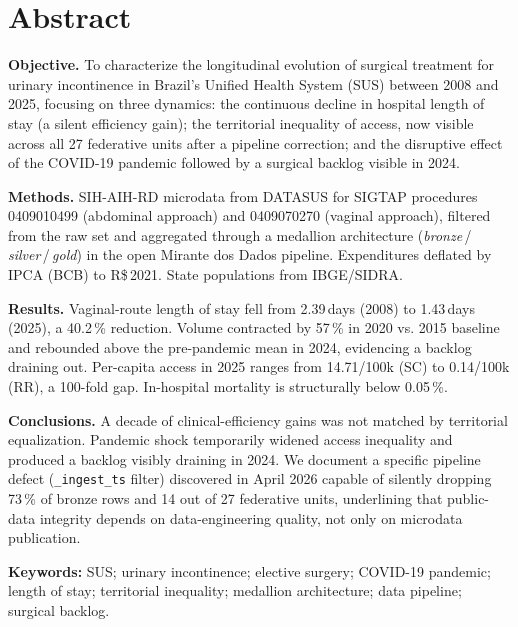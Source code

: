 \documentclass[12pt,a4paper,oneside]{article}
\newcommand{\rs}{R\$\,}
\begin{document}
\section*{Abstract}
\begin{singlespace}\small\noindent
\textbf{Objective.} To characterize the longitudinal evolution of
surgical treatment for urinary incontinence in Brazil's Unified
Health System (SUS) between 2008 and 2025, focusing on three
dynamics: the continuous decline in hospital length of stay (a
silent efficiency gain); the territorial inequality of access,
now visible across all 27 federative units after a pipeline
correction; and the disruptive effect of the COVID-19 pandemic
followed by a surgical backlog visible in 2024.

\textbf{Methods.} SIH-AIH-RD microdata from DATASUS for SIGTAP
procedures 0409010499 (abdominal approach) and 0409070270 (vaginal
approach), filtered from the raw set and aggregated through a
medallion architecture (\textit{bronze}\,/\,\textit{silver}\,/\,\textit{gold})
in the open Mirante dos Dados pipeline. Expenditures deflated by
IPCA (BCB) to \rs 2021. State populations from IBGE/SIDRA.

\textbf{Results.} Vaginal-route length of stay fell from
2.39\,days (2008) to 1.43\,days (2025), a 40.2\,\% reduction.
Volume contracted by 57\,\% in 2020 vs.
2015 baseline and rebounded above the pre-pandemic
mean in 2024, evidencing a backlog draining out.
Per-capita access in 2025 ranges from 14.71/100k (SC) to
0.14/100k (RR), a 100-fold gap. In-hospital mortality is
structurally below 0.05\,\%.

\textbf{Conclusions.} A decade of clinical-efficiency gains was
not matched by territorial equalization. Pandemic shock
temporarily widened access inequality and produced a backlog
visibly draining in 2024. We document a specific
pipeline defect (\texttt{\_ingest\_ts} filter) discovered in
April 2026 capable of silently dropping 73\,\% of bronze rows
and 14 out of 27 federative units, underlining that public-data
integrity depends on data-engineering quality, not only on
microdata publication.

\vspace{4pt}
\textbf{Keywords:} SUS; urinary incontinence; elective surgery;
COVID-19 pandemic; length of stay; territorial inequality;
medallion architecture; data pipeline; surgical backlog.
\end{singlespace}
\end{document}
